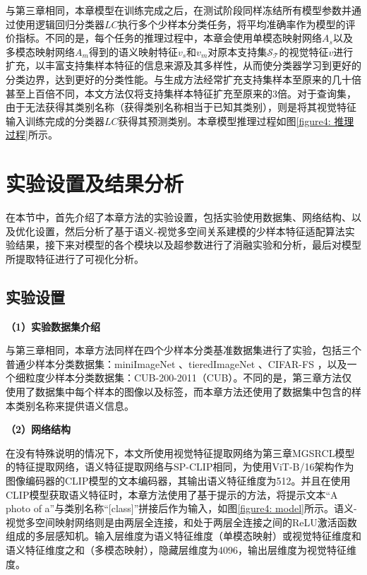 与第三章相同，本章模型在训练完成之后，在测试阶段同样冻结所有模型参数并通过使用逻辑回归分类器$LC$执行多个少样本分类任务，将平均准确率作为模型的评价指标。不同的是，每个任务的推理过程中，本章会使用单模态映射网络$A_s$以及多模态映射网络$A_m$得到的语义映射特征$v_s$和$v_m$对原本支持集$\mathcal{S}_{\mathcal{T}}$的视觉特征$v$进行扩充，以丰富支持集样本特征的信息来源及其多样性，从而使分类器学习到更好的分类边界，达到更好的分类性能。与生成方法经常扩充支持集样本至原来的几十倍甚至上百倍不同，本文方法仅将支持集样本特征扩充至原来的3倍。对于查询集，由于无法获得其类别名称（获得类别名称相当于已知其类别），则是将其视觉特征输入训练完成的分类器$LC$获得其预测类别。本章模型推理过程如图\ref{figure4: 推理过程}所示。

\section[\hspace{-2pt}实验设置及结果分析]{{\heiti{} \hspace{-8pt}实验设置及结果分析}}\label{section4: 实验设置及结果分析}

在本节中，首先介绍了本章方法的实验设置，包括实验使用数据集、网络结构、以及优化设置，然后分析了基于语义-视觉多空间关系建模的少样本特征适配算法实验结果，接下来对模型的各个模块以及超参数进行了消融实验和分析，最后对模型所提取特征进行了可视化分析。

\subsection[\hspace{-2pt}实验设置]{{\heiti{} \hspace{-8pt}实验设置}}\label{section4: 实验设置}

\textbf{（1）实验数据集介绍}

与第三章相同，本章方法同样在四个少样本分类基准数据集进行了实验，包括三个普通少样本分类数据集：miniImageNet \cite{vinyals2016matching}、tieredImageNet \cite{ren2018meta}、CIFAR-FS \cite{bertinetto2018meta}，以及一个细粒度少样本分类数据集：CUB-200-2011（CUB）\cite{wah2011caltech}。不同的是，第三章方法仅使用了数据集中每个样本的图像以及标签，而本章方法还使用了数据集中包含的样本类别名称来提供语义信息。

\textbf{（2）网络结构}

在没有特殊说明的情况下，本文所使用视觉特征提取网络为第三章MGSRCL模型的特征提取网络，语义特征提取网络与SP-CLIP\cite{SP-CLIP}相同，为使用ViT-B/16架构作为图像编码器的CLIP模型的文本编码器，其输出语义特征维度为512。并且在使用CLIP模型获取语义特征时，本章方法使用了基于提示的方法，将提示文本“A photo of a”与类别名称“[class]”拼接后作为输入，如图\ref{figure4: model}所示。语义-视觉多空间映射网络则是由两层全连接，和处于两层全连接之间的ReLU激活函数组成的多层感知机。输入层维度为语义特征维度（单模态映射）或视觉特征维度和语义特征维度之和（多模态映射），隐藏层维度为4096，输出层维度为视觉特征维度。

